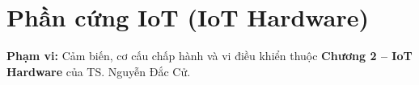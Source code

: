 \chapter{Phần cứng IoT (IoT Hardware)}
\label{chap:hardware}
\begin{notebox}
\textbf{Phạm vi:} Cảm biến, cơ cấu chấp hành và vi điều khiển
thuộc \textbf{Chương 2 -- IoT Hardware} của TS. Nguyễn Đắc Cử.
\end{notebox}



